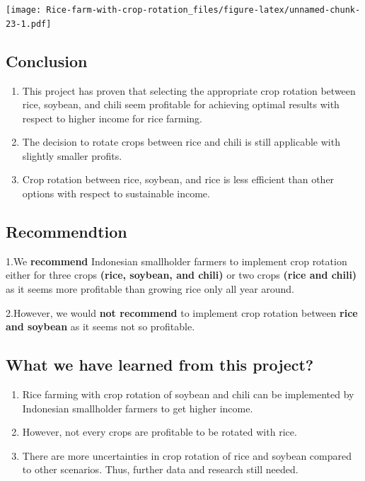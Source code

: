 \documentclass[
]{article}
\providecommand{\tightlist}{%
  \setlength{\itemsep}{0pt}\setlength{\parskip}{0pt}}
\begin{document}
\texttt{[image: Rice-farm-with-crop-rotation\_files/figure-latex/unnamed-chunk-23-1.pdf]}

\hypertarget{conclusion}{%
\subsection{Conclusion}\label{conclusion}}

\begin{enumerate}
\def\labelenumi{\arabic{enumi}.}
\tightlist
\item
  This project has proven that selecting the appropriate crop rotation
  between rice, soybean, and chili seem profitable for achieving optimal
  results with respect to higher income for rice farming.
\item
  The decision to rotate crops between rice and chili is still
  applicable with slightly smaller profits.~
\item
  Crop rotation between rice, soybean, and rice is less efficient than
  other options with respect to sustainable income.
\end{enumerate}

\hypertarget{recommendtion}{%
\subsection{Recommendtion}\label{recommendtion}}

1.We \textbf{recommend} Indonesian smallholder farmers to implement crop
rotation either for three crops \textbf{(rice, soybean, and chili)} or
two crops \textbf{(rice and chili)} as it seems more profitable than
growing rice only all year around.

2.However, we would \textbf{not recommend} to implement crop rotation
between \textbf{rice and soybean} as it seems not so profitable.

\hypertarget{what-we-have-learned-from-this-project}{%
\subsection{What we have learned from this
project?}\label{what-we-have-learned-from-this-project}}

\begin{enumerate}
\def\labelenumi{\arabic{enumi}.}
\tightlist
\item
  Rice farming with crop rotation of soybean and chili can be
  implemented by Indonesian smallholder farmers to get higher income.
\item
  However, not every crops are profitable to be rotated with rice.
\item
  There are more uncertainties in crop rotation of rice and soybean
  compared to other scenarios. Thus, further data and research still
  needed.
\end{enumerate}
\end{document}
